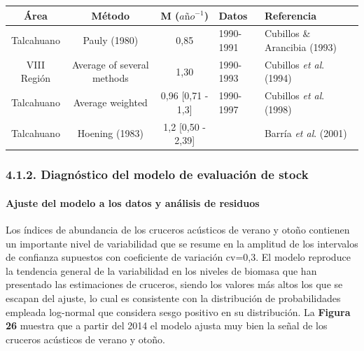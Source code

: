 \documentclass[
  spanish,
]{article}
\begin{document}
\begin{table}[h]
  \centering
  \resizebox{16cm}{!} {
  \begin{tabular}{|c|c|c|l|l|}
  \hline
Área          & Método                     & M ($año^{-1}$)       & Datos      & Referencia                     \\ \hline
Talcahuano  & Pauly (1980)               & 0,85                 & 1990-1991  & Cubillos \& Arancibia (1993)   \\
VIII Región & Average of several methods & 1,30                 & 1990-1993  & Cubillos \textit{et al}. (1994)   \\  
Talcahuano  & Average weighted           & 0,96  [0,71 - 1,3]   & 1990-1997  & Cubillos \textit{et al}. (1998)   \\
Talcahuano  & Hoening (1983)             & 1,2 [0,50 - 2,39]    &            & Barría \textit{et al}. (2001)     \\ \hline
  \end{tabular}}
    \end{table}

\normalsize

\pagebreak

\hypertarget{diagnuxf3stico-del-modelo-de-evaluaciuxf3n-de-stock-1}{%
\subsubsection{4.1.2. Diagnóstico del modelo de evaluación de
stock}\label{diagnuxf3stico-del-modelo-de-evaluaciuxf3n-de-stock-1}}

\hypertarget{ajuste-del-modelo-a-los-datos-y-anuxe1lisis-de-residuos}{%
\paragraph{Ajuste del modelo a los datos y análisis de
residuos}\label{ajuste-del-modelo-a-los-datos-y-anuxe1lisis-de-residuos}}

\quad

Los índices de abundancia de los cruceros acústicos de verano y otoño
contienen un importante nivel de variabilidad que se resume en la
amplitud de los intervalos de confianza supuestos con coeficiente de
variación cv=0,3. El modelo reproduce la tendencia general de la
variabilidad en los niveles de biomasa que han presentado las
estimaciones de cruceros, siendo los valores más altos los que se
escapan del ajuste, lo cual es consistente con la distribución de
probabilidades empleada log-normal que considera sesgo positivo en su
distribución. La \textbf{Figura 26} muestra que a partir del 2014 el
modelo ajusta muy bien la señal de los cruceros acústicos de verano y
otoño.
\end{document}
